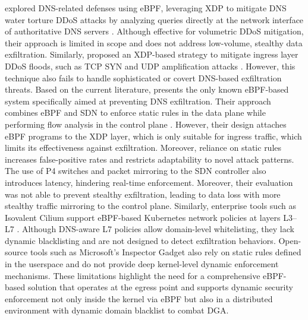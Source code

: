 \documentclass [11pt, proquest] {uwthesis}[2020/02/24]
\begin{document}
\citeauthor{9165454} explored DNS-related defenses using eBPF, leveraging XDP to mitigate DNS water torture DDoS attacks by analyzing queries directly at the network interface of authoritative DNS servers \cite{9165454}. Although effective for volumetric DDoS mitigation, their approach is limited in scope and does not address low-volume, stealthy data exfiltration. Similarly, \citeauthor{bertin2017xdp} proposed an XDP-based strategy to mitigate ingress layer DDoS floods, such as TCP SYN and UDP amplification attacks \cite{bertin2017xdp}. However, this technique also fails to handle sophisticated or covert DNS-based exfiltration threats.
Based on the current literature, \citeauthor{8725640} presents the only known eBPF-based system specifically aimed at preventing DNS exfiltration. Their approach combines eBPF and SDN to enforce static rules in the data plane while performing flow analysis in the control plane \cite{8725640, steadman2021dnsxp}. However, their design attaches eBPF programs to the XDP layer, which is only suitable for ingress traffic, which limits its effectiveness against exfiltration. Moreover, reliance on static rules increases false-positive rates and restricts adaptability to novel attack patterns. The use of P4 switches and packet mirroring to the SDN controller also introduces latency, hindering real-time enforcement. Moreover, their evaluation was not able to prevent stealthy exfiltration, leading to data loss with more stealthy traffic mirroring to the control plane. Similarly, enterprise tools such as Isovalent Cilium support eBPF-based Kubernetes network policies at layers L3–L7 \cite{zavarella2022methodology, 10.1145/3651890.3672227}. Although DNS-aware L7 policies allow domain-level whitelisting, they lack dynamic blacklisting and are not designed to detect exfiltration behaviors. Open-source tools such as Microsoft's Inspector Gadget also rely on static rules defined in the userspace and do not provide deep kernel-level dynamic enforcement mechanisms. These limitations highlight the need for a comprehensive eBPF-based solution that operates at the egress point and supports dynamic security enforcement not only inside the kernel via eBPF but also in a distributed environment with dynamic domain blacklist to combat DGA. 
\end{document}

